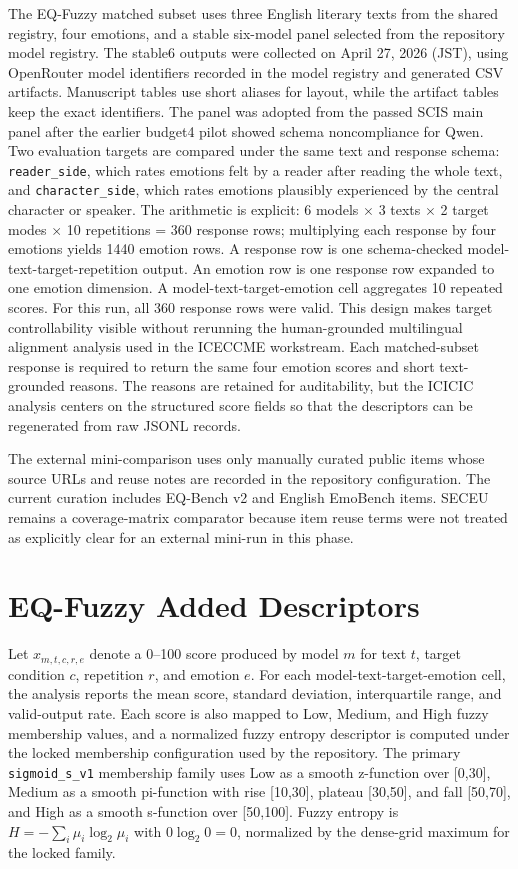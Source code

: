 \documentclass[12pt,a4paper]{icicel}
\begin{document}
The EQ-Fuzzy matched subset uses three English literary texts from the shared
registry, four emotions, and a stable six-model panel selected from the
repository model registry.
The stable6 outputs were collected on April 27, 2026 (JST), using OpenRouter
model identifiers recorded in the model registry and generated CSV artifacts.
Manuscript tables use short aliases for layout, while the artifact tables keep
the exact identifiers.
The panel was adopted from the passed SCIS main panel after the earlier
budget4 pilot showed schema noncompliance for Qwen.
Two evaluation targets are compared under the same text and response schema:
\texttt{reader\_side}, which rates emotions felt by a reader after reading the
whole text, and \texttt{character\_side}, which rates emotions plausibly
experienced by the central character or speaker.
The arithmetic is explicit:
6 models $\times$ 3 texts $\times$ 2 target modes $\times$ 10 repetitions
= 360 response rows; multiplying each response by four emotions yields
1440 emotion rows.
A response row is one schema-checked model-text-target-repetition output.
An emotion row is one response row expanded to one emotion dimension.
A model-text-target-emotion cell aggregates 10 repeated scores.
For this run, all 360 response rows were valid.
This design makes target controllability visible without rerunning the
human-grounded multilingual alignment analysis used in the ICECCME workstream.
Each matched-subset response is required to return the same four emotion
scores and short text-grounded reasons.
The reasons are retained for auditability, but the ICICIC analysis centers on
the structured score fields so that the descriptors can be regenerated from
raw JSONL records.

The external mini-comparison uses only manually curated public items whose
source URLs and reuse notes are recorded in the repository configuration.
The current curation includes EQ-Bench v2 and English EmoBench items.
SECEU remains a coverage-matrix comparator because item reuse terms were not
treated as explicitly clear for an external mini-run in this phase.

\section{EQ-Fuzzy Added Descriptors}
Let $x_{m,t,c,r,e}$ denote a 0--100 score produced by model $m$ for text $t$,
target condition $c$, repetition $r$, and emotion $e$.
For each model-text-target-emotion cell, the analysis reports the mean score,
standard deviation, interquartile range, and valid-output rate.
Each score is also mapped to Low, Medium, and High fuzzy membership values, and
a normalized fuzzy entropy descriptor is computed under the locked membership
configuration used by the repository.
The primary \texttt{sigmoid\_s\_v1} membership family uses Low as a smooth
z-function over [0,30], Medium as a smooth pi-function with rise [10,30],
plateau [30,50], and fall [50,70], and High as a smooth s-function over
[50,100].
Fuzzy entropy is $H=-\sum_i \mu_i \log_2 \mu_i$ with $0\log_2 0=0$, normalized
by the dense-grid maximum for the locked family.
\end{document}
